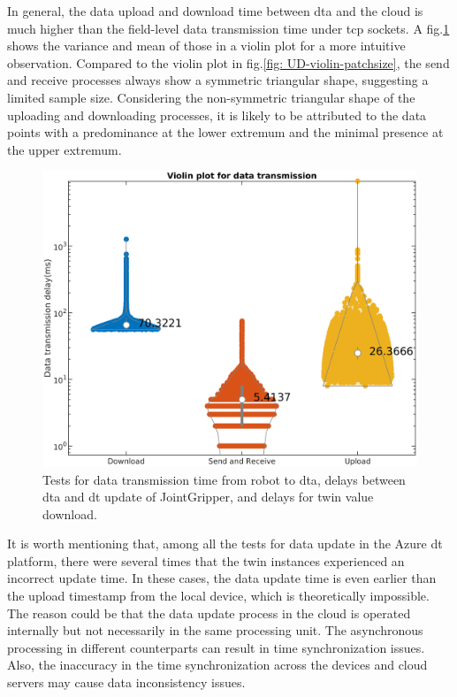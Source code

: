 In general, the data upload and download time between \gls{dta} and the cloud is 
much higher than the field-level data transmission time under \gls{tcp} sockets. 
A fig.\ref{fig: SR-U-D-violin} shows the variance and mean of those in a violin plot 
for a more intuitive observation. 
Compared to the violin plot in fig.\ref{fig: UD-violin-patchsize}, the send and receive 
processes always show a symmetric triangular shape, suggesting a limited sample size. 
Considering the non-symmetric triangular shape of the uploading and downloading processes, 
it is likely to be attributed to the data points with a predominance at the lower extremum 
and the minimal presence at the upper extremum.
\begin{figure}[htb]
    \includegraphics[width=\textwidth]{figures/tests/DT/log_violin_Plot_3cat.png}
    \centering
    \caption{Tests for data transmission time from robot to \gls{dta}, 
    delays between \gls{dta} and \gls{dt} 
    update of JointGripper, and delays for twin value download.\label{fig: SR-U-D-violin}} 
\end{figure}


It is worth mentioning that, among all the tests for data update 
in the Azure \gls{dt} platform, there were several times that the 
twin instances experienced an incorrect update time. In these cases, 
the data update time is even earlier than the upload timestamp from the 
local device, which is theoretically impossible. The reason could be 
that the data update process in the cloud is operated internally but not necessarily in 
the same processing unit. The asynchronous processing in different counterparts 
can result in time synchronization issues. Also, the inaccuracy in the 
time synchronization across the devices and cloud servers may cause data 
inconsistency issues.



